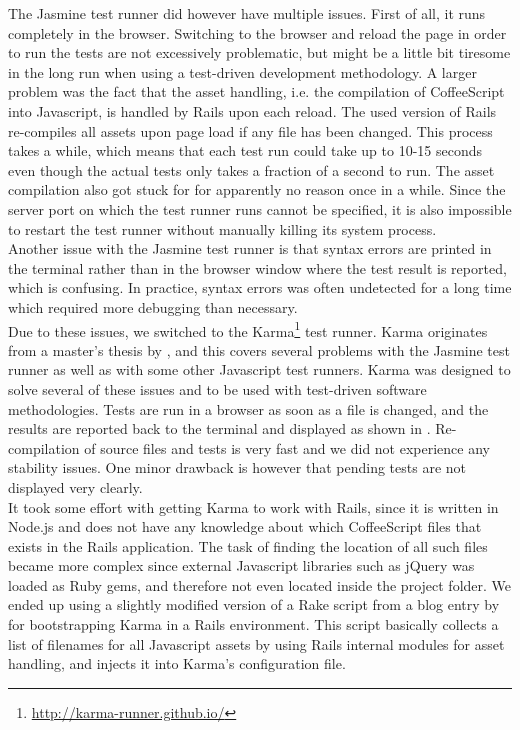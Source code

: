 The Jasmine test runner did however have multiple issues. First of all,
it runs completely in the browser. Switching to the browser and reload
the page in order to run the tests are not excessively problematic, but
might be a little bit tiresome in the long run when using a test-driven
development methodology. A larger problem was the fact that the asset
handling, i.e. the compilation of CoffeeScript into Javascript, is
handled by Rails upon each reload. The used version of Rails re-compiles
all assets upon page load if any file has been changed. This process
takes a while, which means that each test run could take up to 10-15
seconds even though the actual tests only takes a fraction of a second
to run. The asset compilation also got stuck for for apparently no
reason once in a while. Since the server port on which the test runner
runs cannot be specified, it is also impossible to restart the test
runner without manually killing its system process.\\

Another issue with the Jasmine test runner is that syntax errors are
printed in the terminal rather than in the browser window where the test
result is reported, which is confusing. In practice, syntax errors was
often undetected for a long time which required more debugging than
necessary.\\

Due to these issues, we switched to the Karma\footnote{
\url{http://karma-runner.github.io/}} test runner. Karma originates from
a master's thesis by \citet{article:karma}, and this covers several
problems with the Jasmine test runner as well as with some other
Javascript test runners. Karma was designed to solve several of these
issues and to be used with test-driven software methodologies. Tests are
run in a browser as soon as a file is changed, and the results are
reported back to the terminal and displayed as shown in
. Re-compilation of source files and tests is
very fast and we did not experience any stability issues. One minor
drawback is however that pending tests are not displayed very clearly.\\

It took some effort with getting Karma to work with Rails, since it is
written in Node.js and does not have any knowledge about which
CoffeeScript files that exists in the Rails application. The task of
finding the location of all such files became more complex since
external Javascript libraries such as jQuery was loaded as Ruby gems,
and therefore not even located inside the project folder. We ended up
using a slightly modified version of a Rake script from a blog entry by
\citet{web:saunier_angular} for bootstrapping Karma in a Rails
environment. This script basically collects a list of filenames for all
Javascript assets by using Rails internal modules for asset handling,
and injects it into Karma's configuration file.\\

